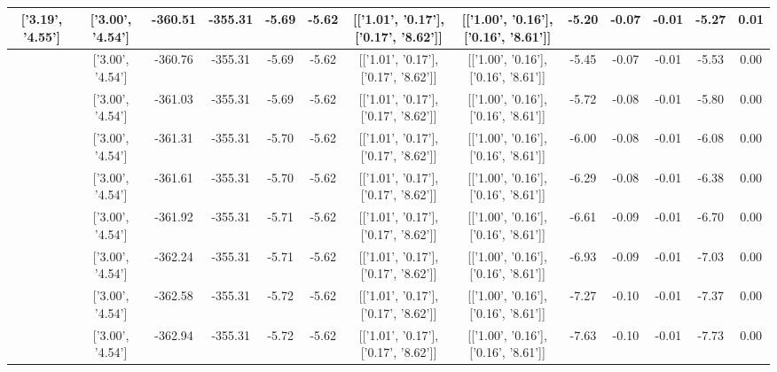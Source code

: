 \begin{table}[htbp]
\begin{adjustbox}{angle=90}
\begin{tabular}{|c|c|c|c|c|c|c|c|c|c|c|c|c|}
 ['3.19', '4.55'] & ['3.00', '4.54'] & -360.51 & -355.31 & -5.69 & -5.62 & [['1.01', '0.17'], ['0.17', '8.62']] & [['1.00', '0.16'], ['0.16', '8.61']] & -5.20 & -0.07 & -0.01 & -5.27 & 0.01\\ \hline
 ['3.21', '4.55'] & ['3.00', '4.54'] & -360.76 & -355.31 & -5.69 & -5.62 & [['1.01', '0.17'], ['0.17', '8.62']] & [['1.00', '0.16'], ['0.16', '8.61']] & -5.45 & -0.07 & -0.01 & -5.53 & 0.00\\ \hline
 ['3.22', '4.55'] & ['3.00', '4.54'] & -361.03 & -355.31 & -5.69 & -5.62 & [['1.01', '0.17'], ['0.17', '8.62']] & [['1.00', '0.16'], ['0.16', '8.61']] & -5.72 & -0.08 & -0.01 & -5.80 & 0.00\\ \hline
 ['3.23', '4.55'] & ['3.00', '4.54'] & -361.31 & -355.31 & -5.70 & -5.62 & [['1.01', '0.17'], ['0.17', '8.62']] & [['1.00', '0.16'], ['0.16', '8.61']] & -6.00 & -0.08 & -0.01 & -6.08 & 0.00\\ \hline
 ['3.24', '4.55'] & ['3.00', '4.54'] & -361.61 & -355.31 & -5.70 & -5.62 & [['1.01', '0.17'], ['0.17', '8.62']] & [['1.00', '0.16'], ['0.16', '8.61']] & -6.29 & -0.08 & -0.01 & -6.38 & 0.00\\ \hline
 ['3.25', '4.56'] & ['3.00', '4.54'] & -361.92 & -355.31 & -5.71 & -5.62 & [['1.01', '0.17'], ['0.17', '8.62']] & [['1.00', '0.16'], ['0.16', '8.61']] & -6.61 & -0.09 & -0.01 & -6.70 & 0.00\\ \hline
 ['3.27', '4.56'] & ['3.00', '4.54'] & -362.24 & -355.31 & -5.71 & -5.62 & [['1.01', '0.17'], ['0.17', '8.62']] & [['1.00', '0.16'], ['0.16', '8.61']] & -6.93 & -0.09 & -0.01 & -7.03 & 0.00\\ \hline
 ['3.28', '4.56'] & ['3.00', '4.54'] & -362.58 & -355.31 & -5.72 & -5.62 & [['1.01', '0.17'], ['0.17', '8.62']] & [['1.00', '0.16'], ['0.16', '8.61']] & -7.27 & -0.10 & -0.01 & -7.37 & 0.00\\ \hline
 ['3.29', '4.56'] & ['3.00', '4.54'] & -362.94 & -355.31 & -5.72 & -5.62 & [['1.01', '0.17'], ['0.17', '8.62']] & [['1.00', '0.16'], ['0.16', '8.61']] & -7.63 & -0.10 & -0.01 & -7.73 & 0.00\\ \hline
            \end{tabular}
        \end{adjustbox}
        \caption{}
        \label{}
    \end{table}
    